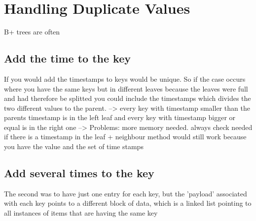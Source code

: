 \documentclass[abstracton,12pt]{scrreprt}
\begin{document}
\section{Handling Duplicate Values}

B+ trees are often 

\subsection{Add the time to the key}
If you would add the timestamps to keys would be unique. So if the case occurs where you have the same keys but in different leaves because the leaves were full and had therefore be splitted you could include the timestamps which divides the two different values to the parent. --> every key with timestamp smaller than the parents timestamp is in the left leaf and every key with timestamp bigger or equal is in the right one --> 
Problems: more memory needed. always check needed if there is a timestamp in the leaf
+ neighbour method would still work because you have the value and the set of time stamps 

\subsection{Add several times to the key}

The second was to have just one entry for each key, but the 'payload' associated with each key points to a different block of data, which is a linked list pointing to all instances of items that are having the same key
\end{document}

